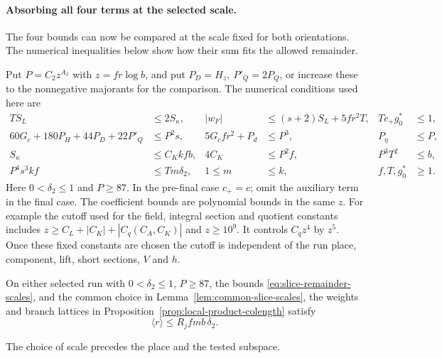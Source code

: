 \paragraph{Absorbing all four terms at the selected scale.}

The four bounds can now be compared at the scale fixed for both orientations. The numerical inequalities below show how their sum fits the allowed remainder.

Put \(P=C_2z^{A_2}\) with \(z=fr\log b\), and put \(P_D=H_z,\ P'_Q=2P_Q\), or increase these to the nonnegative majorants for the comparison. The numerical conditions used here are
\begingroup\small
\begin{equation}\label{eq:slice-remainder-scales}\begin{aligned}
 T S_L&\le2 S_\kappa,&
 |w_F|&\le(s+2)S_L+5fr^2T,&Tc_+g_0^*&\le1,\\
 60G_c+180P_H+44P_D+22P'_Q&\le P^2s,&
 5G_cfr^2+P_d&\le P^3,& P_\eta&\le P,\\
 S_\kappa&\le C_K kfb,&4C_K&\le P^2 f,&
             P^3 T^2&\le b,\\
 P^4s^3kf&\le Tm\delta_2,&
 1\le m&\le k,&f,T,g_0^*&\ge1 .
\end{aligned}\end{equation}
\endgroup
Here \(0<\delta_2\le1\) and \(P\ge87\). In the pre-final
case \(c_+=c\); omit the auxiliary term in the final case.
The coefficient bounds are polynomial bounds in the same
\(z\). For example the cutoff used for the field, integral
section and quotient constants includes \(z\ge
C_L+|C_K|+|C_q(C_A,C_K)|\) and \(z\ge10^9\).
It controls \(C_q z^4\) by \(z^5\). Once these fixed
constants are chosen the cutoff is independent of the run
place, component, lift, short sections, \(V\) and \(h\).
\label{cor:slice-budget-3}



\begin{proposition}\label{prop:scaled-geometric-remainder}
On either selected run with \(0<\delta_2\le1\), \(P\ge87\),
the bounds \eqref{eq:slice-remainder-scales}, and the common
choice in Lemma~\ref{lem:common-slice-scales}, the weights
and branch lattices in Proposition~\ref{prop:local-product-colength}
satisfy
\[
 \langle r\rangle\le R_j fmb\,\delta_2.
\]

The choice of scale precedes the place and the tested subspace.
\end{proposition}

